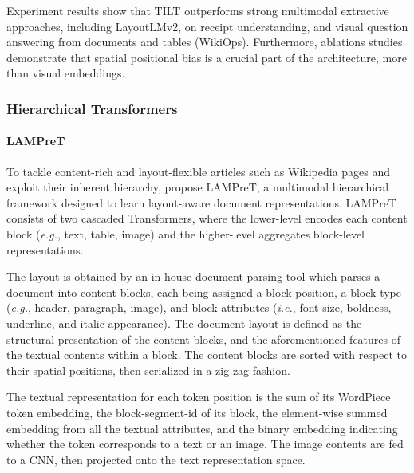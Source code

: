 Experiment results show that TILT outperforms strong multimodal extractive approaches, including LayoutLMv2, on receipt understanding, and visual question answering from documents and tables (WikiOps). Furthermore, ablations studies demonstrate that spatial positional bias is a crucial part of the architecture, more than visual embeddings. 


\subsubsection{Hierarchical Transformers}

\paragraph{\ac{LAMPreT}} 

To tackle content-rich and layout-flexible articles such as Wikipedia pages and exploit their inherent hierarchy, \citet{wu2021lampret} propose \ac{LAMPreT}, a multimodal hierarchical framework designed to learn layout-aware document representations. \ac{LAMPreT} consists of two cascaded Transformers, where the lower-level encodes each content block (\textit{e.g.}, text, table, image) and the higher-level aggregates block-level representations.

The layout is obtained by an in-house document parsing tool which parses a document into content blocks, each being assigned a block position, a block type (\textit{e.g.}, header, paragraph, image), and block attributes (\textit{i.e.}, font size, boldness, underline, and italic appearance). The document layout is defined as the structural presentation of the content blocks, and the aforementioned features of the textual contents within a block. The content blocks are sorted with respect to their spatial positions, then serialized in a zig-zag fashion.

The textual representation for each token position is the sum of its WordPiece token embedding, the block-segment-id of its block, the element-wise summed embedding from all the textual attributes, and the binary embedding indicating whether the token corresponds to a text or an image. The image contents are fed to a \ac{CNN}, then projected onto the text representation space. 

